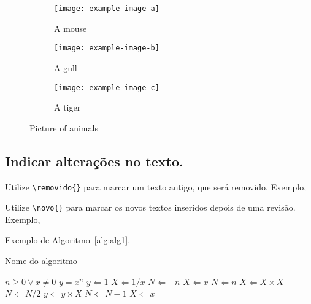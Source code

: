 \begin{figure}
\centering
\begin{subfigure}[b]{.45\linewidth}
\texttt{[image: example-image-a]}
\caption{A mouse}\label{fig:mouse}
\end{subfigure}
\begin{subfigure}[b]{.45\linewidth}
\texttt{[image: example-image-b]}
\caption{A gull}\label{fig:gull}
\end{subfigure}
\begin{subfigure}[b]{.45\linewidth}
\texttt{[image: example-image-c]}
\caption{A tiger}\label{fig:tiger}
\end{subfigure}
\caption{Picture of animals}
\label{fig:animals}
\end{figure}

\subsection{Indicar alterações no texto.}

Utilize \verb|\removido{}| para marcar um texto antigo, que será removido. Exemplo,  

Utilize \verb|\novo{}| para marcar os novos textos inseridos depois de uma revisão. Exemplo,  

Exemplo de Algoritmo~\ref{alg:alg1}.

\begin{algorithm} %
\caption{Nome do algoritmo} %
\label{alg:alg1} %
\begin{algorithmic}[1] %
    \REQUIRE $n \geq 0 \vee x \neq 0$
    \ENSURE $y = x^n$ 
    \STATE $y \Leftarrow 1$
        \STATE $X \Leftarrow 1 / x$
        \STATE $N \Leftarrow -n$
    \ELSE
        \STATE $X \Leftarrow x$
        \STATE $N \Leftarrow n$
    \ENDIF
            \STATE $X \Leftarrow X \times X$
            \STATE $N \Leftarrow N / 2$
        \ELSE  [$N$ is odd]
            \STATE $y \Leftarrow y \times X$
            \STATE $N \Leftarrow N - 1$
        \ENDIF
    \ENDWHILE
        \STATE $X \Leftarrow x$
    \ENDFOR
\end{algorithmic}
\end{algorithm}



